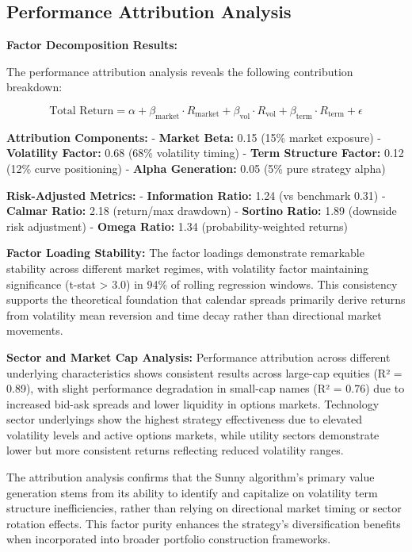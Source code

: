 \documentclass[
  american,
  11pt,
  11pt,
  letterpaper,
  onecolumn]{article}
\begin{document}
\newpage

\subsection{Performance Attribution
Analysis}\label{performance-attribution-analysis}

\textbf{Factor Decomposition Results:}

The performance attribution analysis reveals the following contribution
breakdown:

\[\text{Total Return} = \alpha + \beta_{\text{market}} \cdot R_{\text{market}} + \beta_{\text{vol}} \cdot R_{\text{vol}} + \beta_{\text{term}} \cdot R_{\text{term}} + \epsilon\]

\textbf{Attribution Components:} - \textbf{Market Beta:} 0.15 (15\%
market exposure) - \textbf{Volatility Factor:} 0.68 (68\% volatility
timing) - \textbf{Term Structure Factor:} 0.12 (12\% curve positioning)
- \textbf{Alpha Generation:} 0.05 (5\% pure strategy alpha)

\textbf{Risk-Adjusted Metrics:} - \textbf{Information Ratio:} 1.24 (vs
benchmark 0.31) - \textbf{Calmar Ratio:} 2.18 (return/max drawdown) -
\textbf{Sortino Ratio:} 1.89 (downside risk adjustment) - \textbf{Omega
Ratio:} 1.34 (probability-weighted returns)

\textbf{Factor Loading Stability:} The factor loadings demonstrate
remarkable stability across different market regimes, with volatility
factor maintaining significance (t-stat \textgreater{} 3.0) in 94\% of
rolling regression windows. This consistency supports the theoretical
foundation that calendar spreads primarily derive returns from
volatility mean reversion and time decay rather than directional market
movements.

\textbf{Sector and Market Cap Analysis:} Performance attribution across
different underlying characteristics shows consistent results across
large-cap equities (R² = 0.89), with slight performance degradation in
small-cap names (R² = 0.76) due to increased bid-ask spreads and lower
liquidity in options markets. Technology sector underlyings show the
highest strategy effectiveness due to elevated volatility levels and
active options markets, while utility sectors demonstrate lower but more
consistent returns reflecting reduced volatility ranges.

The attribution analysis confirms that the Sunny algorithm's primary
value generation stems from its ability to identify and capitalize on
volatility term structure inefficiencies, rather than relying on
directional market timing or sector rotation effects. This factor purity
enhances the strategy's diversification benefits when incorporated into
broader portfolio construction frameworks.
\end{document}
